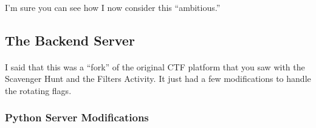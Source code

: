 \documentclass[11pt]{article}
\begin{document}
	\paragraph{} I'm sure you can see how I now consider this ``ambitious.'' 

	\subsection{The Backend Server}

	\paragraph{} I said that this was a ``fork'' of the original CTF platform that you saw with the Scavenger Hunt and the Filters Activity. It just had a few modifications to handle the rotating flags.

	\begin{center}
		\graphicspath{ {.} }
		\centering
	\end{center}

	\newpage

	\subsubsection{Python Server Modifications}
\end{document}
